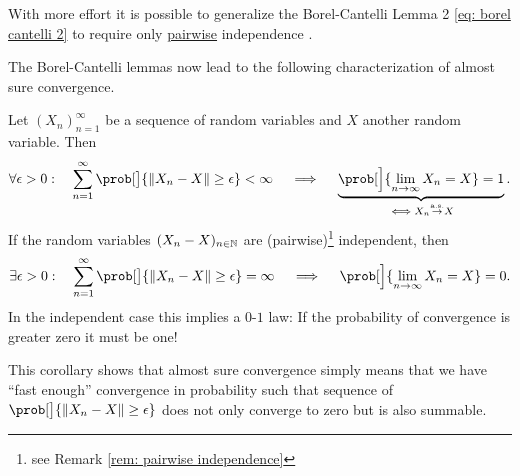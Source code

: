 \begin{remark}
    \label{rem: pairwise independence}
    With more effort it is possible to generalize the
    Borel-Cantelli Lemma 2 \eqref{eq: borel cantelli 2} to require only
    \underline{pairwise} independence \citep{doeringStochastik2022}.
\end{remark}

The Borel-Cantelli lemmas now lead to the following characterization of almost
sure convergence.

\begin{mdframed}[innertopmargin=0pt]
\begin{corollary}
    \label{cor: characterization of almost sure convergence}
    Let \((X_n)_{n=1}^\infty\) be a sequence of random variables and \(X\) another random variable.
    Then
    \[
        \forall \epsilon > 0: \quad
        \sum_{n=1}^\infty \prob[\big]{\norm{X_n - X} \ge \epsilon} < \infty
         \quad \implies \quad \underbrace{
            \prob[\Big]{\lim_{n\to\infty} X_n = X} =1
        }_{
            \iff X_n\overset{\as}\to X
        }.
    \]
    If the random variables \((X_n-X)_{n\in \mathbb{N}}\) are (pairwise)\footnote{see Remark \ref{rem: pairwise independence}} independent, then
    \[
        \exists \epsilon > 0: \quad
        \sum_{n=1}^\infty \prob[\big]{\norm{X_n - X} \ge \epsilon} = \infty
        \quad \implies \quad \prob[\Big]{\lim_{n\to\infty} X_n = X} =0.
    \]
    In the independent case this implies a \(0\)-\(1\) law: If the probability of
    convergence is greater zero it must be one!
\end{corollary}
\end{mdframed}

This corollary shows that almost sure convergence simply means that we have
``fast enough'' convergence in probability such that sequence of
\(\prob[\big]{\norm{X_n - X} \ge \epsilon}\) does not only converge to zero but is also
summable.

